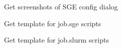 
\begin{DoxyRefList}
\item[\label{todo__todo000001}%
\hypertarget{todo__todo000001}{}%
Page \hyperlink{tut-xo}{Xtal\-Opt Tutorial} ]Get screenshots of S\-G\-E config dialog

Get template for job.\-sge scripts

Get template for job.\-slurm scripts
\end{DoxyRefList}